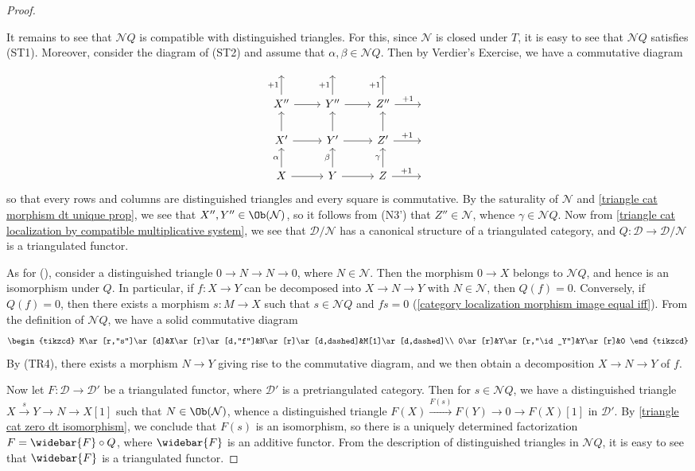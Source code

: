 \begin{proof}
\begin{enumerate}[leftmargin=40pt]
\end{enumerate}
It remains to see that $\mathcal{N}Q$ is compatible with distinguished triangles. For this, since $\mathcal{N}$ is closed under $T$, it is easy to see that $\mathcal{N}Q$ satisfies (ST1). Moreover, consider the diagram of (ST2) and assume that $\alpha,\beta\in\mathcal{N}Q$. Then by Verdier's Exercise, we have a commutative diagram
\[\begin{tikzcd}
{}&{}&{}\\
X''\ar[r]\ar[u,"+1"]&Y''\ar[r]\ar[u,"+1"]&Z''\ar[r,"+1"]\ar[u,"+1"]&{}\\
X'\ar[r]\ar[u]&Y'\ar[r]\ar[u]&Z'\ar[r,"+1"]\ar[u]&{}\\
X\ar[r]\ar[u,"\alpha"]&Y\ar[r]\ar[u,"\beta"]&Z\ar[u,"\gamma"]\ar[r,"+1"]&{}
\end{tikzcd}\]
so that every rows and columns are distinguished triangles and every square is commutative. By the saturality of $\mathcal{N}$ and \cref{triangle cat morphism dt unique prop}, we see that $X'',Y''\in\Ob(\mathcal{N})$, so it follows from (N3') that $Z''\in\mathcal{N}$, whence $\gamma\in\mathcal{N}Q$. Now from \cref{triangle cat localization by compatible multiplicative system}, we see that $\mathcal{D}/\mathcal{N}$ has a canonical structure of a triangulated category, and $Q:\mathcal{D}\to\mathcal{D}/\mathcal{N}$ is a triangulated functor.\par
As for (), consider a distinguished triangle $0\to N\to N\to 0$, where $N\in\mathcal{N}$. Then the morphism $0\to X$ belongs to $\mathcal{N}Q$, and hence is an isomorphism under $Q$. In particular, if $f:X\to Y$ can be decomposed into $X\to N\to Y$ with $N\in\mathcal{N}$, then $Q(f)=0$. Conversely, if $Q(f)=0$, then there exists a morphism $s:M\to X$ such that $s\in\mathcal{N}Q$ and $fs=0$ (\cref{category localization morphism image equal iff}). From the definition of $\mathcal{N}Q$, we have a solid commutative diagram
\[\begin{tikzcd}
M\ar[r,"s"]\ar[d]&X\ar[r]\ar[d,"f"]&N\ar[r]\ar[d,dashed]&M[1]\ar[d,dashed]\\
0\ar[r]&Y\ar[r,"\id_Y"]&Y\ar[r]&0
\end{tikzcd}\]
By (TR4), there exists a morphism $N\to Y$ giving rise to the commutative diagram, and we then obtain a decomposition $X\to N\to Y$ of $f$.\par
Now let $F:\mathcal{D}\to\mathcal{D}'$ be a triangulated functor, where $\mathcal{D}'$ is a pretriangulated category. Then for $s\in\mathcal{N}Q$, we have a distinguished triangle $X\stackrel{s}{\to} Y\to N\to X[1]$ such that $N\in\Ob(\mathcal{N})$, whence a distinguished triangle $F(X)\stackrel{F(s)}{\to} F(Y)\to 0\to F(X)[1]$ in $\mathcal{D}'$. By \cref{triangle cat zero dt isomorphism}, we conclude that $F(s)$ is an isomorphism, so there is a uniquely determined factorization $F=\widebar{F}\circ Q$, where $\widebar{F}$ is an additive functor. From the description of distinguished triangles in $\mathcal{N}Q$, it is easy to see that $\widebar{F}$ is a triangulated functor.\par

\end{proof}
